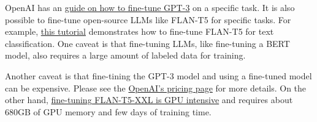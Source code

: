 \documentclass[11pt]{article}
\begin{document}
OpenAI has an
\href{https://platform.openai.com/docs/guides/fine-tuning}{guide on how
to fine-tune GPT-3} on a specific task. It is also possible to fine-tune
open-source LLMs like FLAN-T5 for specific tasks. For example,
\href{https://medium.com/google-cloud/fine-tuning-flan-t5-xxl-with-deepspeed-and-vertex-ai-af499daf694d}{this
tutorial} demonstrates how to fine-tune FLAN-T5 for text classification.
One caveat is that fine-tuning LLMs, like fine-tuning a BERT model, also
requires a large amount of labeled data for training.

Another caveat is that fine-tining the GPT-3 model and using a
fine-tuned model can be expensive. Please see the
\href{https://openai.com/pricing}{OpenAI's pricing page} for more
details. On the other hand,
\href{https://medium.com/google-cloud/fine-tuning-flan-t5-xxl-with-deepspeed-and-vertex-ai-af499daf694d}{fine-tuning
FLAN-T5-XXL is GPU intensive} and requires about 680GB of GPU memory and
few days of training time.


    
    
    
\end{document}
